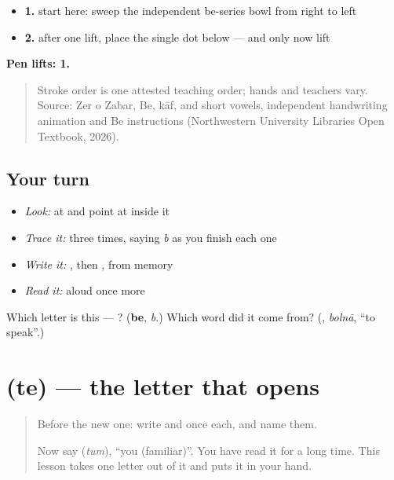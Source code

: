 \begin{itemize}
\raggedright
  \item \textbf{1.} start here: sweep the independent be-series bowl from right to left
  \item \textbf{2.} after one lift, place the single dot below — and only now lift
\end{itemize}

\textbf{Pen lifts: 1.}

\begin{quote}
Stroke order is one attested teaching order; hands and teachers vary. Source: Zer o Zabar, Be, kāf, and short vowels, independent  handwriting animation and Be instructions (Northwestern University Libraries Open Textbook, 2026).
\end{quote}

\subsection*{Your turn}
\begin{itemize}
\raggedright
  \item \emph{Look:} at \textbf{} and point at  inside it
  \item \emph{Trace it:}  three times, saying \emph{b} as you finish each one
  \item \emph{Write it:} , then , from memory
  \item \emph{Read it:} \textbf{} aloud once more
\end{itemize}

\begin{tcolorbox}[breakable,colback=teal!4,colframe=teal!35!black,title={Before you move on}]
Which letter is this — ? (\textbf{be}, \emph{b}.) Which word did it come from? (\textbf{}, \emph{bolnā}, \textquotedblleft{}to speak\textquotedblright{}.)
\end{tcolorbox}
\section[\texorpdfstring{\ur{ت} (te)}{ت (te)}]{ (te) — the letter that opens }

\label{lesson:UR-W34-te}



\begin{quote}
Before the new one: write  and  once each, and name them.

Now say \textbf{} (\emph{tum}), \textquotedblleft{}you (familiar)\textquotedblright{}. You have read it for a long time. This lesson takes one letter out of it and puts it in your hand.
\end{quote}

